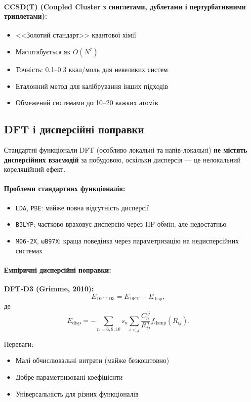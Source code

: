 \paragraph{CCSD(T) (Coupled Cluster з синглетами, дублетами і пертурбативними триплетами):}
\begin{itemize}
    \item <<Золотий стандарт>> квантової хімії
    \item Масштабується як \(O(N^7)\)
    \item Точність: 0.1--0.3 ккал/моль для невеликих систем
    \item Еталонний метод для калібрування інших підходів
    \item Обмежений системами до 10--20 важких атомів
\end{itemize}

\subsection{DFT і дисперсійні поправки}

Стандартні функціонали DFT (особливо локальні та напів-локальні) \textbf{не містять дисперсійних взаємодій} за побудовою, оскільки дисперсія --- це нелокальний кореляційний ефект.

\paragraph{Проблеми стандартних функціоналів:}
\begin{itemize}
    \item \texttt{LDA}, \texttt{PBE}: майже повна відсутність дисперсії
    \item \texttt{B3LYP}: частково враховує дисперсію через HF-обмін, але недостатньо
    \item \texttt{M06-2X}, \texttt{ωB97X}: краща поведінка через параметризацію на недисперсійних системах
\end{itemize}

\paragraph{Емпіричні дисперсійні поправки:}

\textbf{DFT-D3 (Grimme, 2010):}
\[
E_{\text{DFT-D3}} = E_{\text{DFT}} + E_{\text{disp}},
\]
де
\[
E_{\text{disp}} = -\sum_{n=6,8,10} s_n \sum_{i<j} \frac{C_n^{ij}}{R_{ij}^n} f_{\text{damp}}(R_{ij}).
\]

Переваги:
\begin{itemize}
    \item Малі обчислювальні витрати (майже безкоштовно)
    \item Добре параметризовані коефіцієнти
    \item Універсальність для різних функціоналів
\end{itemize}

